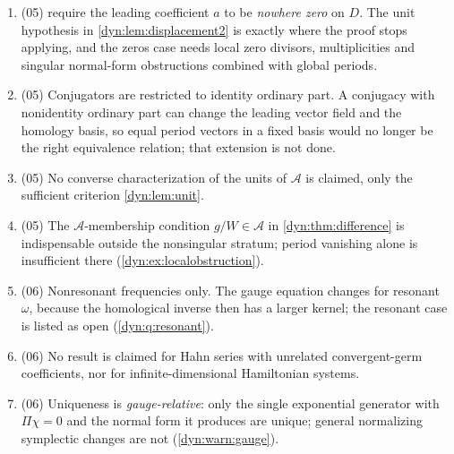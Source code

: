 \documentclass[11pt,letterpaper]{article}
\theoremstyle{definition}
\theoremstyle{remark}
\newcommand{\AAA}{\mathscr A}
\newcommand{\eps}{\varepsilon}
\numberwithin{equation}{section}
\begin{document}
\begin{enumerate}[label=\textbf{N\arabic*.},leftmargin=3.2em,start=18]
normalization point permits the regular quotient
\eqref{dyn:eq:regularR}; a common ordinary domain permits coefficientwise
primitives without an uncontrolled sequence of shrinking radii; positive
support makes the operator logarithm strongly meaningful; the polynomial
Euler form fixes all zeros and gives the exact factor
$W_\eps=VB_\eps$, whereas a general perturbation can move zeros or create
different coefficient pole patterns; and divisibility of $\Gamma$ is used
to keep the resonant rescaling inside the chosen workspace.
\item (05)  require the
leading coefficient $a$ to be \emph{nowhere zero} on $D$. The unit
hypothesis in \cref{dyn:lem:displacement2} is exactly where the proof stops
applying, and the zeros case needs local zero divisors, multiplicities and
singular normal-form obstructions combined with global periods.
\item (05) Conjugators are restricted to identity ordinary part. A
conjugacy with nonidentity ordinary part can change the leading vector
field and the homology basis, so equal period vectors in a fixed basis
would no longer be the right equivalence relation; that extension is not
done.
\item (05) No converse characterization of the units of $\AAA$ is claimed,
only the sufficient criterion \cref{dyn:lem:unit}.
\item (05) The $\AAA$-membership condition $g/W\in\AAA$ in
\cref{dyn:thm:difference} is indispensable outside the nonsingular stratum;
period vanishing alone is insufficient there
(\cref{dyn:ex:localobstruction}).
\item (06) Nonresonant frequencies only. The gauge equation changes for
resonant $\omega$, because the homological inverse then has a larger
kernel; the resonant case is listed as open
(\cref{dyn:q:resonant}).
\item (06) No result is claimed for Hahn series with unrelated
convergent-germ coefficients, nor for infinite-dimensional Hamiltonian
systems.
\item (06) Uniqueness is \emph{gauge-relative}: only the single
exponential generator with $\Pi\chi=0$ and the normal form it produces are
unique; general normalizing symplectic changes are not
(\cref{dyn:warn:gauge}).
\end{enumerate}
\end{document}
